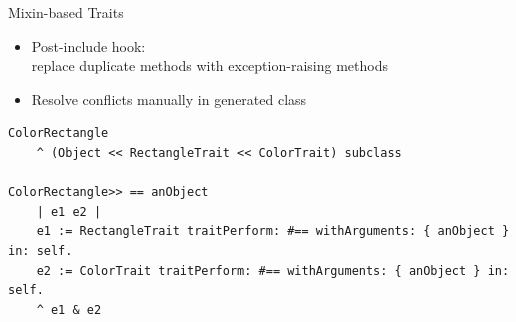 \documentclass[xcolor=dvipsname, handout]{beamer} %
\begin{document}
\begin{frame}[fragile]{Mixin-based Traits}
\begin{itemize}
  \item Post-include hook: \\ replace duplicate methods with exception-raising methods
  \item Resolve conflicts manually in generated class
\end{itemize}
\begin{lstlisting}
ColorRectangle
    ^ (Object << RectangleTrait << ColorTrait) subclass

ColorRectangle>> == anObject
    | e1 e2 |
    e1 := RectangleTrait traitPerform: #== withArguments: { anObject } in: self.
    e2 := ColorTrait traitPerform: #== withArguments: { anObject } in: self.
    ^ e1 & e2
\end{lstlisting}
\end{frame}


\end{document}
